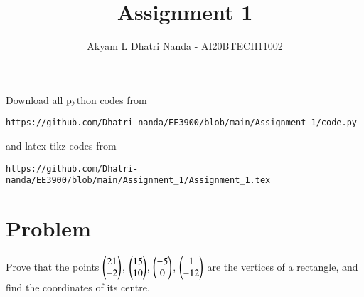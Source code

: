 \documentclass[journal,12pt,twocolumn]{IEEEtran}
\begin{document}
     \def\rightbox#1{\makebox[0in][r]{#1}}
     \def\centbox#1{\makebox[0in]{#1}}
     \def\topbox#1{\raisebox{-\baselineskip}[0in][0in]{#1}}
     \def\midbox#1{\raisebox{-0.5\baselineskip}[0in][0in]{#1}}
\vspace{3cm}
\title{Assignment 1}
\author{Akyam L Dhatri Nanda - AI20BTECH11002}
\maketitle
\newpage
\bigskip
\renewcommand{\thefigure}{\theenumi}
\renewcommand{\thetable}{\theenumi}
Download all python codes from 
\begin{lstlisting}
https://github.com/Dhatri-nanda/EE3900/blob/main/Assignment_1/code.py
\end{lstlisting}
%
and latex-tikz codes from 
%
\begin{lstlisting}
https://github.com/Dhatri-nanda/EE3900/blob/main/Assignment_1/Assignment_1.tex
\end{lstlisting}
\section{Problem}
Prove that the points $\begin{pmatrix}21\\-2\end{pmatrix}$, $\begin{pmatrix}15\\10\end{pmatrix}$, $\begin{pmatrix}-5\\0\end{pmatrix}$, $\begin{pmatrix}1\\-12\end{pmatrix}$ are the vertices of a rectangle, and find the coordinates of its centre.
\end{document}
